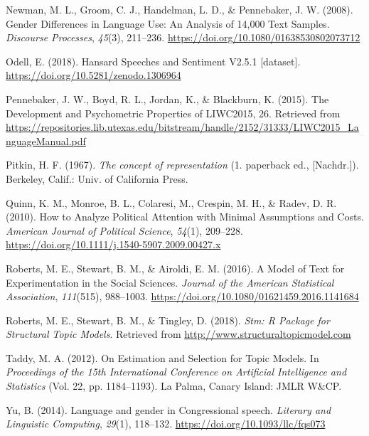 \documentclass[]{article}
\theoremstyle{definition}
\theoremstyle{definition}
\theoremstyle{definition}
\theoremstyle{remark}
\begin{document}
\leavevmode\hypertarget{ref-newman2008}{}%
Newman, M. L., Groom, C. J., Handelman, L. D., \& Pennebaker, J. W.
(2008). Gender Differences in Language Use: An Analysis of 14,000 Text
Samples. \emph{Discourse Processes}, \emph{45}(3), 211--236.
\url{https://doi.org/10.1080/01638530802073712}

\leavevmode\hypertarget{ref-odell2018}{}%
Odell, E. (2018). Hansard Speeches and Sentiment V2.5.1 {[}dataset{]}.
\url{https://doi.org/10.5281/zenodo.1306964}

\leavevmode\hypertarget{ref-pennebaker2015}{}%
Pennebaker, J. W., Boyd, R. L., Jordan, K., \& Blackburn, K. (2015). The
Development and Psychometric Properties of LIWC2015, 26. Retrieved from
\url{https://repositories.lib.utexas.edu/bitstream/handle/2152/31333/LIWC2015_LanguageManual.pdf}

\leavevmode\hypertarget{ref-pitkin1967}{}%
Pitkin, H. F. (1967). \emph{The concept of representation} (1. paperback
ed., {[}Nachdr.{]}). Berkeley, Calif.: Univ. of California Press.

\leavevmode\hypertarget{ref-quinn2010}{}%
Quinn, K. M., Monroe, B. L., Colaresi, M., Crespin, M. H., \& Radev, D.
R. (2010). How to Analyze Political Attention with Minimal Assumptions
and Costs. \emph{American Journal of Political Science}, \emph{54}(1),
209--228. \url{https://doi.org/10.1111/j.1540-5907.2009.00427.x}

\leavevmode\hypertarget{ref-roberts2016}{}%
Roberts, M. E., Stewart, B. M., \& Airoldi, E. M. (2016). A Model of
Text for Experimentation in the Social Sciences. \emph{Journal of the
American Statistical Association}, \emph{111}(515), 988--1003.
\url{https://doi.org/10.1080/01621459.2016.1141684}

\leavevmode\hypertarget{ref-roberts2018}{}%
Roberts, M. E., Stewart, B. M., \& Tingley, D. (2018). \emph{Stm: R
Package for Structural Topic Models}. Retrieved from
\url{http://www.structuraltopicmodel.com}

\leavevmode\hypertarget{ref-taddy2012}{}%
Taddy, M. A. (2012). On Estimation and Selection for Topic Models. In
\emph{Proceedings of the 15th International Conference on Artificial
Intelligence and Statistics} (Vol. 22, pp. 1184--1193). La Palma, Canary
Island: JMLR W\&CP.

\leavevmode\hypertarget{ref-yu2014}{}%
Yu, B. (2014). Language and gender in Congressional speech.
\emph{Literary and Linguistic Computing}, \emph{29}(1), 118--132.
\url{https://doi.org/10.1093/llc/fqs073}
\end{document}
